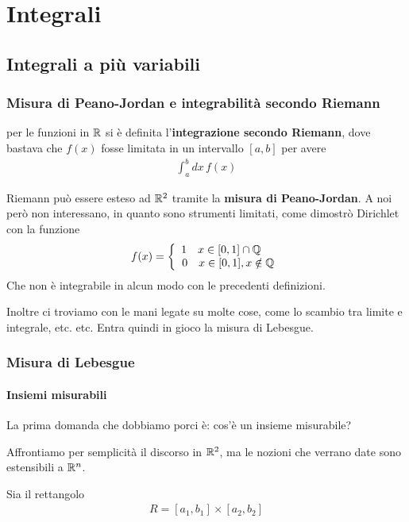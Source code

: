 \chapter{Integrali}

\section{{Integrali a più variabili}}

\subsection{Misura di Peano-Jordan e integrabilità secondo Riemann}

per le funzioni in $\mathbb{R}$ si è definita l'\textbf{integrazione secondo Riemann}, dove bastava che $f(x)$ fosse limitata in un intervallo $[a,b]$ per avere
\begin{align}
	\int_{a}^{b} dx \, f(x)
\end{align}

Riemann può essere esteso ad $\mathbb{R}^2$ tramite la \textbf{misura di Peano-Jordan}. A noi però non interessano, in quanto sono strumenti limitati, come dimostrò Dirichlet con la funzione
\begin{align}
	f(x)=\left\{\begin{array}{cc} 1 \quad x\in [0,1]\cap\mathbb{Q}\quad \; \\ 0 \quad x\in [0,1], x\notin\mathbb{Q} \end{array}\right.
\end{align}
Che non è integrabile in alcun modo con le precedenti definizioni.

Inoltre ci troviamo con le mani legate su molte cose, come lo scambio tra limite e integrale, etc. etc.
Entra quindi in gioco la misura di Lebesgue.

\subsection{Misura di Lebesgue}

\subsubsection{Insiemi misurabili}

La prima domanda che dobbiamo porci è: cos'è un insieme misurabile?

Affrontiamo per semplicità il discorso in $\mathbb{R}^2$, ma le nozioni che verrano date sono estensibili a $\mathbb{R}^n$.

Sia il rettangolo 
\begin{align}
	R= [a_1,b_1]\times [a_2,b_2]
\end{align}

